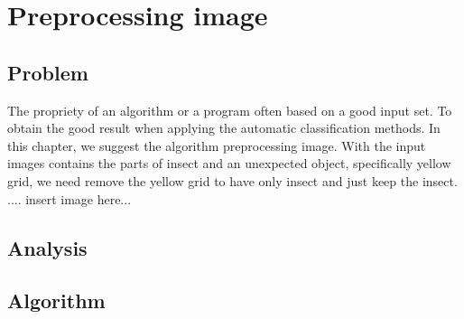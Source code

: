 \chapter{Preprocessing image}
\section{Problem}
The propriety of an algorithm or a program often based on a good input set. To obtain the good result when applying the automatic classification methods. In this chapter, we suggest the algorithm preprocessing image. With the input images contains the parts of insect and an unexpected object, specifically yellow grid, we need remove the yellow grid to have only insect and just keep the insect.
.... insert image here...
\section{Analysis}
\section{Algorithm}
